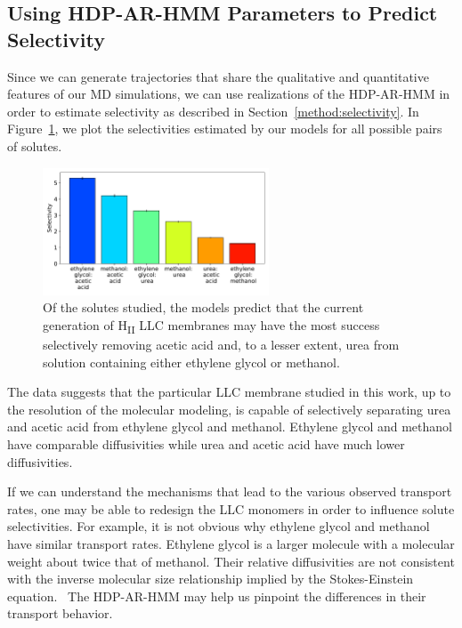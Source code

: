\documentclass[journal=jpcbfk,manuscript=article]{achemso}
\begin{document}
  \subsection{Using HDP-AR-HMM Parameters to Predict Selectivity}\label{section:macroscopic_properties}
  
  Since we can generate trajectories that share the qualitative and quantitative
  features of our MD simulations, we can use realizations of the HDP-AR-HMM
  in order to estimate selectivity as described in Section~\ref{method:selectivity}.
  In Figure~\ref{fig:selectivity}, we plot the selectivities estimated by our
  models for all possible pairs of solutes.
  
  \begin{figure}
  \centering
  \includegraphics[width=0.6\textwidth]{selectivity2.pdf}
  \caption{Of the solutes studied, the models predict that the current generation 
  of H\textsubscript{II} LLC membranes may have the most success selectively removing 
  acetic acid and, to a lesser extent, urea from solution containing either ethylene
  glycol or methanol.
  }\label{fig:selectivity}
  \end{figure}

  The data suggests that the particular LLC membrane studied in this work, 
  up to the resolution of the molecular modeling, is capable of selectively 
  separating urea and acetic acid from ethylene glycol and methanol. Ethylene 
  glycol and methanol have comparable diffusivities while urea and acetic 
  acid have much lower diffusivities. 

  If we can understand the mechanisms that lead to the various observed transport
  rates, one may be able to redesign the LLC monomers in order to influence solute
  selectivities. For example, it is not obvious why ethylene glycol and methanol
  have similar transport rates. Ethylene glycol is a larger molecule with a 
  molecular weight about twice that of methanol. Their relative diffusivities are 
  not consistent with the inverse molecular size relationship implied by the 
  Stokes-Einstein equation.~\cite{gierer_molekulare_1953} The HDP-AR-HMM may 
  help us pinpoint the differences in their transport behavior.
  
\end{document}
